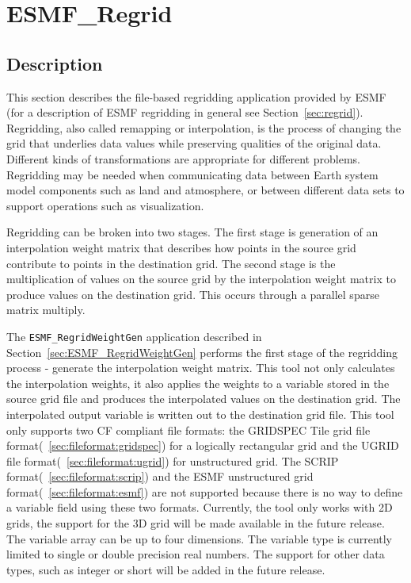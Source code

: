 
\section{ESMF\_Regrid}
\label{sec:ESMF_Regrid}

\subsection{Description}

This section describes the file-based regridding application provided by ESMF (for a description of ESMF regridding in general see Section~\ref{sec:regrid}). Regridding, also called remapping or interpolation, is the process of changing the grid that underlies data values while preserving qualities of the original data. Different kinds of transformations are appropriate for different problems. Regridding may be needed when communicating data between Earth system model components such as land and atmosphere, or between different data sets to support operations such as visualization. 

Regridding can be broken into two stages. The first stage is generation of an interpolation weight matrix that describes how points in
the source grid contribute to points in the destination grid. The second stage is the multiplication of values on the source grid by the
interpolation weight matrix to produce values on the destination grid. This occurs through a parallel sparse matrix multiply.

The {\tt ESMF\_RegridWeightGen} application described in Section~\ref{sec:ESMF_RegridWeightGen} 
performs the first stage of the regridding process - generate the interpolation weight matrix. 
This tool not only calculates the interpolation weights, it also applies the weights to a variable 
stored in the source grid file and produces the interpolated values on the destination grid. 
The interpolated output variable is written out to the destination grid file.  This tool only
supports two CF compliant file formats: the GRIDSPEC Tile grid file format(~\ref{sec:fileformat:gridspec}) for
a logically rectangular grid and the UGRID file format(~\ref{sec:fileformat:ugrid}) for unstructured grid.  
The SCRIP format(~\ref{sec:fileformat:scrip}) and the ESMF unstructured grid format(~\ref{sec:fileformat:esmf}) are not supported because there is no way to define a variable field using these two formats. Currently, the tool only works with 2D grids, the support for the 3D grid will be 
made available in the future release.  The variable array can be up to four dimensions.  The
variable type is currently limited to single or double precision real numbers.  The support for 
other data types, such as integer or short will be added in the future release.  

